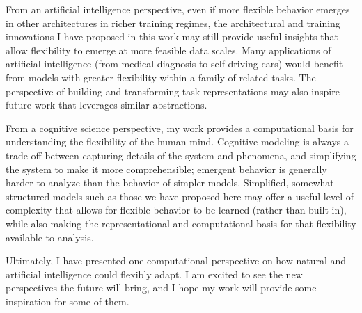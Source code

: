 From an artificial intelligence perspective, even if more flexible behavior emerges in other architectures in richer training regimes, the architectural and training innovations I have proposed in this work may still provide useful insights that allow flexibility to emerge at more feasible data scales. Many applications of artificial intelligence (from medical diagnosis to self-driving cars) would benefit from models with greater flexibility within a family of related tasks. The perspective of building and transforming task representations may also inspire future work that leverages similar abstractions. \par 

From a cognitive science perspective, my work provides a computational basis for understanding the flexibility of the human mind. Cognitive modeling is always a trade-off between capturing details of the system and phenomena, and simplifying the system to make it more comprehensible; emergent behavior is generally harder to analyze than the behavior of simpler models. Simplified, somewhat structured models such as those we have proposed here may offer a useful level of complexity that allows for flexible behavior to be learned (rather than built in), while also making the representational and computational basis for that flexibility available to analysis. \par 

Ultimately, I have presented one computational perspective on how natural and artificial intelligence could flexibly adapt. I am excited to see the new perspectives the future will bring, and I hope my work will provide some inspiration for some of them. 
